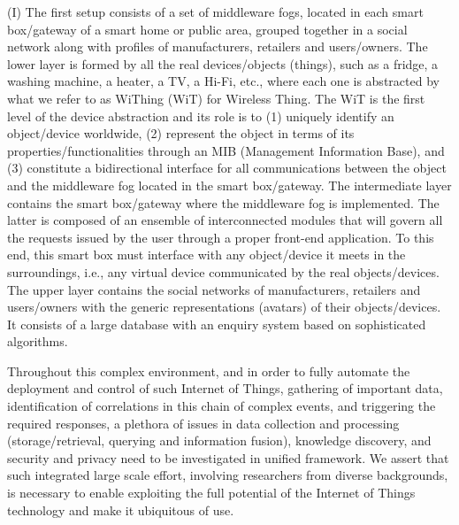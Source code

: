 (I)  The first setup consists of a set of middleware fogs, located in each smart box/gateway of a smart home or public area, grouped together in a social network along with profiles of manufacturers, retailers and users/owners. The lower layer is formed by all the real devices/objects (things), such as a fridge, a washing machine, a heater, a TV, a Hi-Fi, etc., where each one is abstracted by what we refer to as WiThing (WiT) for Wireless Thing. The WiT is the first level of the device abstraction and its role is to (1) uniquely identify an object/device worldwide, (2) represent the object in terms of its properties/functionalities through an MIB (Management Information Base), and (3) constitute a bidirectional interface for all communications between the object and the middleware fog located in the smart box/gateway. The intermediate layer contains the smart box/gateway where the middleware fog is implemented. The latter is composed of an ensemble of interconnected modules that will govern all the requests issued by the user through a proper front-end application. To this end, this smart box must interface with any object/device it meets in the surroundings, i.e., any virtual device communicated by the real objects/devices. The upper layer contains the social networks of manufacturers, retailers and users/owners with the generic representations (avatars) of their objects/devices. It consists of a large database with an enquiry system based on sophisticated algorithms.

Throughout this complex environment, and in order to fully automate the deployment and control of such Internet of Things, gathering of important data, identification of correlations in this chain of complex events, and triggering the required responses, a plethora of issues in data collection and processing (storage/retrieval, querying and information fusion), knowledge discovery, and security and privacy need to be investigated in unified framework. We assert that  such integrated large scale effort, involving researchers from diverse backgrounds, is necessary to  enable exploiting the full potential of the Internet of Things technology  and make it ubiquitous of use.\\

